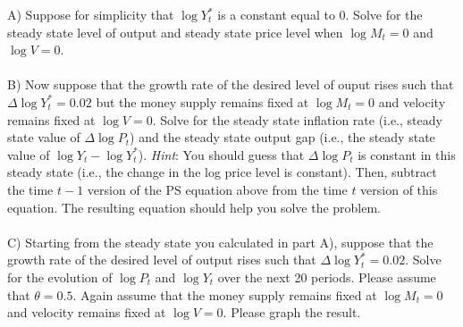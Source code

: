 \begin{homeworkProblem}[1]
    A) Suppose for simplicity that $\log Y_t^*$ is a constant equal to 0. Solve
    for the steady state level of output and steady state price level when $\log M_t 
    = 0$ and $\log V=0$. 
    \\ \\
    B) Now suppose that the growth rate of the desired level of ouput rises
    such that $\Delta \log Y_t^* = 0.02$ but the money supply remains fixed
    at $\log M_t = 0$ and velocity remains fixed at $\log V=0$. Solve for the
    steady state inflation rate (i.e., steady state value of $\Delta \log P_t$)
    and the steady state output gap (i.e., the steady state value of $\log Y_t
    - \log Y_t^*$). \textit{Hint}: You should guess that $\Delta \log P_t$ is 
    constant in this steady state (i.e., the change in the log price level is
    constant). Then, subtract the time $t - 1$ version of the PS equation above 
    from the time $t$ version of this equation. The resulting equation should 
    help you solve the problem.
    \\ \\
    C) Starting from the steady state you calculated in part A), suppose that
    the growth rate of the desired level of output rises such that $\Delta \log 
    Y_t^* = 0.02$. Solve for the evolution of $\log P_t$ and $\log Y_t$ over the
    next 20 periods. Please assume that $\theta = 0.5$. Again assume that the 
    money supply remains fixed at $\log M_t = 0$ and velocity remains fixed at
    $\log V = 0$. Please graph the result. 
    
    \pagebreak
    
\end{homeworkProblem}